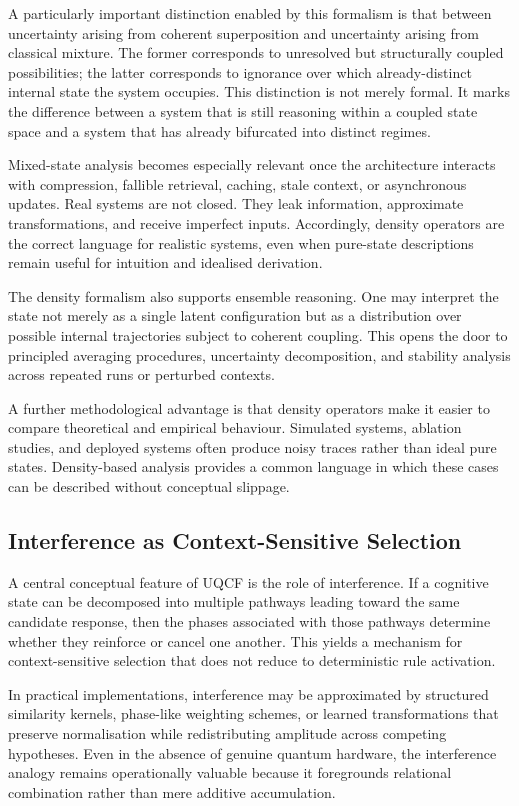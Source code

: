 \documentclass[12pt]{article}
\begin{document}
A particularly important distinction enabled by this formalism is that between uncertainty arising from coherent superposition and uncertainty arising from classical mixture. The former corresponds to unresolved but structurally coupled possibilities; the latter corresponds to ignorance over which already-distinct internal state the system occupies. This distinction is not merely formal. It marks the difference between a system that is still reasoning within a coupled state space and a system that has already bifurcated into distinct regimes.

Mixed-state analysis becomes especially relevant once the architecture interacts with compression, fallible retrieval, caching, stale context, or asynchronous updates. Real systems are not closed. They leak information, approximate transformations, and receive imperfect inputs. Accordingly, density operators are the correct language for realistic systems, even when pure-state descriptions remain useful for intuition and idealised derivation.

The density formalism also supports ensemble reasoning. One may interpret the state not merely as a single latent configuration but as a distribution over possible internal trajectories subject to coherent coupling. This opens the door to principled averaging procedures, uncertainty decomposition, and stability analysis across repeated runs or perturbed contexts.

A further methodological advantage is that density operators make it easier to compare theoretical and empirical behaviour. Simulated systems, ablation studies, and deployed systems often produce noisy traces rather than ideal pure states. Density-based analysis provides a common language in which these cases can be described without conceptual slippage.

\subsection{Interference as Context-Sensitive Selection}
A central conceptual feature of UQCF is the role of interference. If a cognitive state can be decomposed into multiple pathways leading toward the same candidate response, then the phases associated with those pathways determine whether they reinforce or cancel one another. This yields a mechanism for context-sensitive selection that does not reduce to deterministic rule activation.

In practical implementations, interference may be approximated by structured similarity kernels, phase-like weighting schemes, or learned transformations that preserve normalisation while redistributing amplitude across competing hypotheses. Even in the absence of genuine quantum hardware, the interference analogy remains operationally valuable because it foregrounds relational combination rather than mere additive accumulation.
\end{document}
